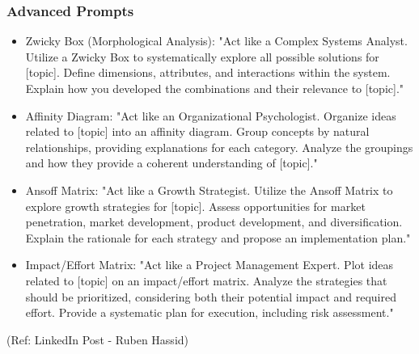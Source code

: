 \begin{frame}[fragile]\frametitle{Advanced Prompts}
\begin{itemize}
    \item Zwicky Box (Morphological Analysis): "Act like a Complex Systems Analyst. Utilize a Zwicky Box to systematically explore all possible solutions for [topic]. Define dimensions, attributes, and interactions within the system. Explain how you developed the combinations and their relevance to [topic]."
    \item Affinity Diagram: "Act like an Organizational Psychologist. Organize ideas related to [topic] into an affinity diagram. Group concepts by natural relationships, providing explanations for each category. Analyze the groupings and how they provide a coherent understanding of [topic]."
    \item Ansoff Matrix: "Act like a Growth Strategist. Utilize the Ansoff Matrix to explore growth strategies for [topic]. Assess opportunities for market penetration, market development, product development, and diversification. Explain the rationale for each strategy and propose an implementation plan."
    \item Impact/Effort Matrix: "Act like a Project Management Expert. Plot ideas related to [topic] on an impact/effort matrix. Analyze the strategies that should be prioritized, considering both their potential impact and required effort. Provide a systematic plan for execution, including risk assessment."
\end{itemize}

{\tiny (Ref: LinkedIn Post - Ruben Hassid)}
\end{frame}


